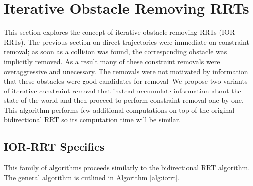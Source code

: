 \section{Iterative Obstacle Removing RRTs}
This section explores the concept of iterative obstacle removing RRTs (IOR-RRTs). The previous section on direct trajectories were immediate on constraint removal; as soon as a collision was found, the corresponding obstacle was implicitly removed. As a result many of these constraint removals were overaggressive and unecessary. The removals were not motivated by information that these obstacles were good candidates for removal. We propose two variants of iterative constraint removal that instead accumulate information about the state of the world and then proceed to perform constraint removal one-by-one. This algorithm performs few additional computations on top of the original bidirectional RRT so its computation time will be similar.

\subsection{IOR-RRT Specifics}
This family of algorithms proceeds similarly to the bidirectional RRT algorithm. The general algorithm is outlined in Algorithm \ref{alg:iorrt}.

